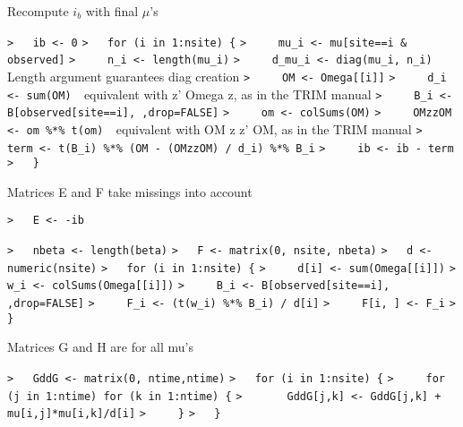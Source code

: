 \documentclass[a4paper]{article}
\begin{document}
Recompute $i_b$ with final $\mu$'s\par
\verb~>   ib <- 0~\newline
\verb~>   for (i in 1:nsite) {~\newline
\verb~>     mu_i <- mu[site==i & observed]~\newline
\verb~>     n_i <- length(mu_i)~\newline
\verb~>     d_mu_i <- diag(mu_i, n_i)  ~{\sffamily Length argument guarantees diag creation}\newline
\verb~>     OM <- Omega[[i]]~\newline
\verb~>     d_i <- sum(OM)  ~{\sffamily equivalent with z' Omega z, as in the TRIM manual}\newline
\verb~>     B_i <- B[observed[site==i], ,drop=FALSE]~\newline
\verb~>     om <- colSums(OM)~\newline
\verb~>     OMzzOM <- om %*% t(om)  ~{\sffamily equivalent with OM z z' OM, as in the TRIM manual}\newline
\verb~>     term <- t(B_i) %*% (OM - (OMzzOM) / d_i) %*% B_i~\newline
\verb~>     ib <- ib - term~\newline
\verb~>   }~\par

Matrices E and F take missings into account\par
\verb~>   E <- -ib~\par

\verb~>   nbeta <- length(beta)~\newline
\verb~>   F <- matrix(0, nsite, nbeta)~\newline
\verb~>   d <- numeric(nsite)~\newline
\verb~>   for (i in 1:nsite) {~\newline
\verb~>     d[i] <- sum(Omega[[i]])~\newline
\verb~>     w_i <- colSums(Omega[[i]])~\newline
\verb~>     B_i <- B[observed[site==i], ,drop=FALSE]~\newline
\verb~>     F_i <- (t(w_i) %*% B_i) / d[i]~\newline
\verb~>     F[i, ] <- F_i~\newline
\verb~>   }~\par

Matrices G and H are for all mu's\par

\verb~>   GddG <- matrix(0, ntime,ntime)~\newline
\verb~>   for (i in 1:nsite) {~\newline
\verb~>     for (j in 1:ntime) for (k in 1:ntime) {~\newline
\verb~>       GddG[j,k] <- GddG[j,k] + mu[i,j]*mu[i,k]/d[i]~\newline
\verb~>     }~\newline
\verb~>   }~\par
\end{document}
